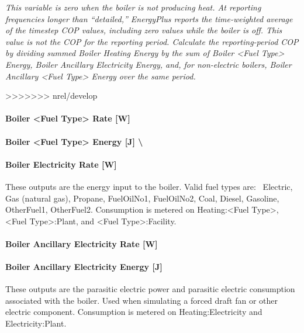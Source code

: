 \emph{This variable is zero when the boiler is not producing heat. At reporting frequencies longer than ``detailed,'' EnergyPlus reports the time-weighted average of the timestep COP values, including zero values while the boiler is off. This value is not the COP for the reporting period. Calculate the reporting-period COP by dividing summed Boiler Heating Energy by the sum of Boiler \textless{}Fuel Type\textgreater{} Energy, Boiler Ancillary Electricity Energy, and, for non-electric boilers, Boiler Ancillary \textless{}Fuel Type\textgreater{} Energy over the same period.}

>>>>>>> nrel/develop
\paragraph{Boiler \textless{}Fuel Type\textgreater{} Rate {[}W{]}}\label{boiler-fuel-type-rate-w}

\paragraph{Boiler \textless{}Fuel Type\textgreater{} Energy {[}J{]} \textbackslash{}}\label{boiler-fuel-type-energy-j}

\paragraph{Boiler Electricity Rate {[}W{]}}\label{boiler-electric-power-w}

These outputs are the energy input to the boiler. Valid fuel types are:~ Electric, Gas (natural gas), Propane, FuelOilNo1, FuelOilNo2, Coal, Diesel, Gasoline, OtherFuel1, OtherFuel2. Consumption is metered on Heating:\textless{}Fuel Type\textgreater{}, \textless{}Fuel Type\textgreater{}:Plant, and \textless{}Fuel Type\textgreater{}:Facility.

\paragraph{Boiler Ancillary Electricity Rate {[}W{]}}\label{boiler-ancillary-electric-power-w}

\paragraph{Boiler Ancillary Electricity Energy {[}J{]}}\label{boiler-ancillary-electric-energy-j}

These outputs are the parasitic electric power and parasitic electric consumption associated with the boiler. Used when simulating a forced draft fan or other electric component. Consumption is metered on Heating:Electricity and Electricity:Plant.

